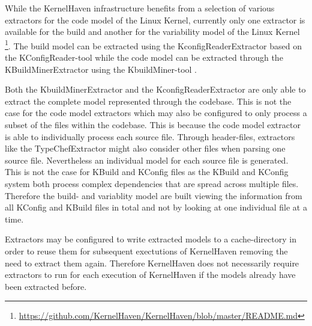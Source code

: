 \documentclass[a4paper]{article}
\begin{document}
While the KernelHaven infrastructure benefits from a selection of various extractors for the code model of the Linux Kernel, currently only one extractor is available for the build and another for the variability model of the Linux Kernel \footnote{\url{https://github.com/KernelHaven/KernelHaven/blob/master/README.md}}. The build model can be extracted using the KconfigReaderExtractor based on the KConfigReader-tool \cite{ck-kconfig} while the code model can be extracted through the KBuildMinerExtractor using the KbuildMiner-tool \cite{ck-kbuild}.

Both the KbuildMinerExtractor and the KconfigReaderExtractor are only able to extract the complete model represented through the codebase. This is not the case for the code model extractors which may also be configured to only process a subset of the files within the codebase. This is because the code model extractor is able to individually process each source file. Through header-files, extractors like the TypeChefExtractor might also consider other files when parsing one source file. Nevertheless an individual model for each source file is generated. This is not the case for KBuild and KConfig files as the KBuild and KConfig system both process complex dependencies that are spread across multiple files. Therefore the build- and variablity model are built viewing the information from all KConfig and KBuild files in total and not by looking at one individual file at a time.

Extractors may be configured to write extracted models to a cache-directory in order to reuse them for subsequent exectutions of KernelHaven removing the need to extract them again. Therefore KernelHaven does not necessarily require extractors to run for each execution of KernelHaven if the models already have been extracted before.
\end{document}
